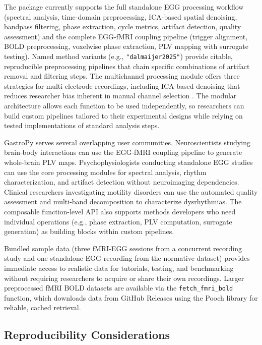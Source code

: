 \documentclass[12pt]{article}
\begin{document}
The package currently supports the full standalone EGG processing workflow
(spectral analysis, time-domain preprocessing, ICA-based spatial denoising,
bandpass filtering, phase extraction, cycle metrics, artifact detection,
quality assessment) and the complete EGG-fMRI coupling pipeline (trigger
alignment, BOLD preprocessing, voxelwise phase extraction, PLV mapping with
surrogate testing). Named method variants (e.g., \texttt{"dalmaijer2025"})
provide citable, reproducible preprocessing pipelines that chain specific
combinations of artifact removal and filtering steps. The multichannel
processing module offers three strategies for multi-electrode recordings,
including ICA-based denoising that reduces researcher bias inherent in manual
channel selection \citep{Anisimova2025}. The modular architecture allows each
function to be used independently, so researchers can build custom
pipelines tailored to their experimental designs while relying on
tested implementations of standard analysis steps.

GastroPy serves several overlapping user communities. Neuroscientists
studying brain-body interactions can use the EGG-fMRI coupling pipeline to
generate whole-brain PLV maps. Psychophysiologists conducting standalone EGG
studies can use the core processing modules for spectral analysis, rhythm
characterization, and artifact detection without neuroimaging dependencies.
Clinical researchers investigating motility disorders can use the automated
quality assessment and multi-band decomposition to characterize dysrhythmias.
The composable function-level API also supports methods developers who need
individual operations (e.g., phase extraction, PLV computation, surrogate
generation) as building blocks within custom pipelines.

Bundled sample data (three fMRI-EGG sessions from a concurrent recording
study and one standalone EGG recording from the \citet{Wolpert2020} normative
dataset) provides immediate access to realistic data for tutorials, testing,
and benchmarking without requiring researchers to acquire or share their own
recordings. Larger preprocessed fMRI BOLD datasets are available via the
\texttt{fetch\_fmri\_bold} function, which downloads data from GitHub Releases
using the Pooch library for reliable, cached retrieval.

\subsection{Reproducibility Considerations}
\end{document}
